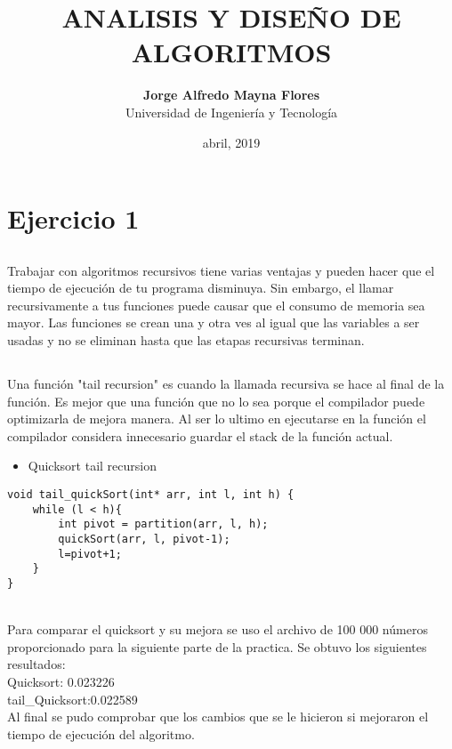 \documentclass{article}
\title{\textbf{ANALISIS Y DISEÑO DE ALGORITMOS}}
\author{\textbf{Jorge Alfredo Mayna Flores} \\
Universidad de Ingeniería y Tecnología}
\date{abril, 2019}
\begin{document}
\maketitle
\section{Ejercicio 1}
\subsection{}
\subsection{}
Trabajar con algoritmos recursivos tiene varias ventajas y pueden hacer que el tiempo de ejecución de tu programa disminuya. Sin embargo, el llamar recursivamente a tus funciones puede causar que el consumo de memoria sea mayor. Las funciones se crean una y otra ves al igual que las variables a ser usadas y no se eliminan hasta que las etapas recursivas terminan.  
\subsection{}
Una función "tail recursion" es  cuando la llamada recursiva se hace al final de la función. Es mejor que una función que no lo sea porque el compilador puede optimizarla de mejora manera. Al ser lo ultimo en ejecutarse en la función el compilador considera innecesario guardar el stack de la función actual.\\
\begin{itemize}
    \item Quicksort tail recursion
\end{itemize}
\begin{lstlisting}
void tail_quickSort(int* arr, int l, int h) {
    while (l < h){
        int pivot = partition(arr, l, h);
        quickSort(arr, l, pivot-1);
        l=pivot+1;
    }
}
\end{lstlisting}\\
Para comparar el quicksort y su mejora se uso el archivo de 100 000 números proporcionado para la siguiente parte de la practica. Se obtuvo los siguientes resultados:\\
Quicksort: 0.023226\\
tail\_Quicksort:0.022589\\
Al final se pudo comprobar que los cambios que se le hicieron si mejoraron el tiempo de ejecución del algoritmo.
\end{document}
